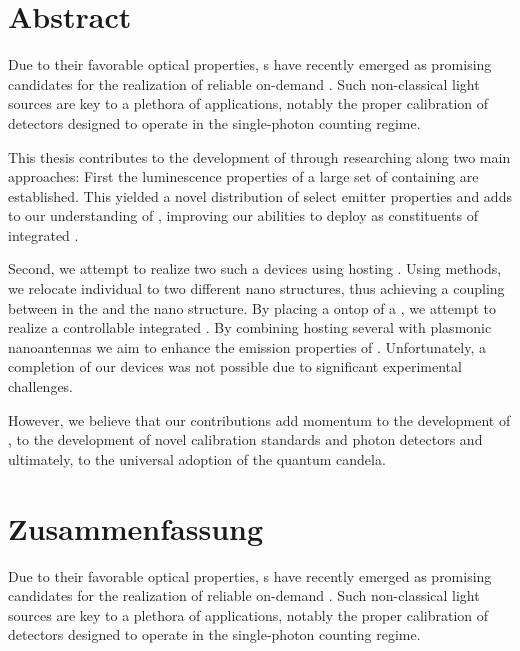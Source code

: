 \null\vfill


\section*{Abstract}

	Due to their favorable optical properties, \sivc{}s have recently emerged as promising candidates for the realization of reliable on-demand \spss. Such non-classical light sources are key to a plethora of applications, notably the proper calibration of detectors designed to operate in the single-photon counting regime.

	This thesis contributes to the development of \spss through researching \sivs along two main approaches: First the luminescence properties of a large set of \nds containing \sivs are established. This yielded a novel distribution of select emitter properties and adds to our understanding of \sivs, improving our abilities to deploy \sivs as constituents of integrated \sps.

	Second, we attempt to realize two such a devices using \nds hosting \sivs. Using \pp methods, we relocate individual \nds to two different nano structures, thus achieving a coupling between \sivs in the \nd and the nano structure. By placing a \nd ontop of a \vcsel, we attempt to realize a controllable integrated \sps. By combining \nds hosting several \sivs with plasmonic nanoantennas we aim to enhance the emission properties of \sivs. Unfortunately, a completion of our devices was not possible due to significant experimental challenges.

	However, we believe that our contributions add momentum to the development of \sps, to the development of novel calibration standards and photon detectors and ultimately, to the universal adoption of the quantum candela.




\vfill

\newpage

\null\vfill

\section*{Zusammenfassung}

	Due to their favorable optical properties, \sivc{}s have recently emerged as promising candidates for the realization of reliable on-demand \spss. Such non-classical light sources are key to a plethora of applications, notably the proper calibration of detectors designed to operate in the single-photon counting regime.

